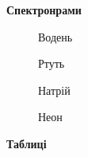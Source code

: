 \documentclass[a4paper,14pt]{extreport}
\begin{document}
\begin{center}
\large{\textbf{Спектронрами}}
\end{center}
\begin{figure}[h]
\caption{Водень}

\end{figure}

\begin{figure}[h]
\caption{Ртуть}
\end{figure}

\begin{figure}[h]
\caption{Натрій}
\end{figure}

\begin{figure}[h!]
\caption{Неон}
\end{figure}

\clearpage
\newpage
\begin{center}
\large{\textbf{Таблиці}}
\end{center}
\end{document}
